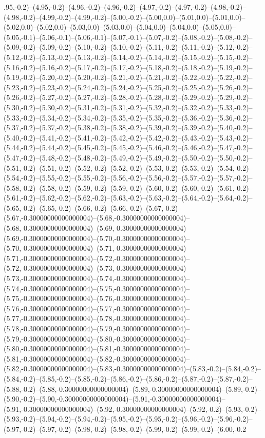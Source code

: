 .95,-0.2)--(4.95,-0.2)--(4.96,-0.2)--(4.96,-0.2)--(4.97,-0.2)--(4.97,-0.2)--(4.98,-0.2)--(4.98,-0.2)--(4.99,-0.2)--(4.99,-0.2)--(5.00,-0.2)--(5.00,0.0)--(5.01,0.0)--(5.01,0.0)--(5.02,0.0)--(5.02,0.0)--(5.03,0.0)--(5.03,0.0)--(5.04,0.0)--(5.04,0.0)--(5.05,0.0)--(5.05,-0.1)--(5.06,-0.1)--(5.06,-0.1)--(5.07,-0.1)--(5.07,-0.2)--(5.08,-0.2)--(5.08,-0.2)--(5.09,-0.2)--(5.09,-0.2)--(5.10,-0.2)--(5.10,-0.2)--(5.11,-0.2)--(5.11,-0.2)--(5.12,-0.2)--(5.12,-0.2)--(5.13,-0.2)--(5.13,-0.2)--(5.14,-0.2)--(5.14,-0.2)--(5.15,-0.2)--(5.15,-0.2)--(5.16,-0.2)--(5.16,-0.2)--(5.17,-0.2)--(5.17,-0.2)--(5.18,-0.2)--(5.18,-0.2)--(5.19,-0.2)--(5.19,-0.2)--(5.20,-0.2)--(5.20,-0.2)--(5.21,-0.2)--(5.21,-0.2)--(5.22,-0.2)--(5.22,-0.2)--(5.23,-0.2)--(5.23,-0.2)--(5.24,-0.2)--(5.24,-0.2)--(5.25,-0.2)--(5.25,-0.2)--(5.26,-0.2)--(5.26,-0.2)--(5.27,-0.2)--(5.27,-0.2)--(5.28,-0.2)--(5.28,-0.2)--(5.29,-0.2)--(5.29,-0.2)--(5.30,-0.2)--(5.30,-0.2)--(5.31,-0.2)--(5.31,-0.2)--(5.32,-0.2)--(5.32,-0.2)--(5.33,-0.2)--(5.33,-0.2)--(5.34,-0.2)--(5.34,-0.2)--(5.35,-0.2)--(5.35,-0.2)--(5.36,-0.2)--(5.36,-0.2)--(5.37,-0.2)--(5.37,-0.2)--(5.38,-0.2)--(5.38,-0.2)--(5.39,-0.2)--(5.39,-0.2)--(5.40,-0.2)--(5.40,-0.2)--(5.41,-0.2)--(5.41,-0.2)--(5.42,-0.2)--(5.42,-0.2)--(5.43,-0.2)--(5.43,-0.2)--(5.44,-0.2)--(5.44,-0.2)--(5.45,-0.2)--(5.45,-0.2)--(5.46,-0.2)--(5.46,-0.2)--(5.47,-0.2)--(5.47,-0.2)--(5.48,-0.2)--(5.48,-0.2)--(5.49,-0.2)--(5.49,-0.2)--(5.50,-0.2)--(5.50,-0.2)--(5.51,-0.2)--(5.51,-0.2)--(5.52,-0.2)--(5.52,-0.2)--(5.53,-0.2)--(5.53,-0.2)--(5.54,-0.2)--(5.54,-0.2)--(5.55,-0.2)--(5.55,-0.2)--(5.56,-0.2)--(5.56,-0.2)--(5.57,-0.2)--(5.57,-0.2)--(5.58,-0.2)--(5.58,-0.2)--(5.59,-0.2)--(5.59,-0.2)--(5.60,-0.2)--(5.60,-0.2)--(5.61,-0.2)--(5.61,-0.2)--(5.62,-0.2)--(5.62,-0.2)--(5.63,-0.2)--(5.63,-0.2)--(5.64,-0.2)--(5.64,-0.2)--(5.65,-0.2)--(5.65,-0.2)--(5.66,-0.2)--(5.66,-0.2)--(5.67,-0.2)--(5.67,-0.30000000000000004)--(5.68,-0.30000000000000004)--(5.68,-0.30000000000000004)--(5.69,-0.30000000000000004)--(5.69,-0.30000000000000004)--(5.70,-0.30000000000000004)--(5.70,-0.30000000000000004)--(5.71,-0.30000000000000004)--(5.71,-0.30000000000000004)--(5.72,-0.30000000000000004)--(5.72,-0.30000000000000004)--(5.73,-0.30000000000000004)--(5.73,-0.30000000000000004)--(5.74,-0.30000000000000004)--(5.74,-0.30000000000000004)--(5.75,-0.30000000000000004)--(5.75,-0.30000000000000004)--(5.76,-0.30000000000000004)--(5.76,-0.30000000000000004)--(5.77,-0.30000000000000004)--(5.77,-0.30000000000000004)--(5.78,-0.30000000000000004)--(5.78,-0.30000000000000004)--(5.79,-0.30000000000000004)--(5.79,-0.30000000000000004)--(5.80,-0.30000000000000004)--(5.80,-0.30000000000000004)--(5.81,-0.30000000000000004)--(5.81,-0.30000000000000004)--(5.82,-0.30000000000000004)--(5.82,-0.30000000000000004)--(5.83,-0.30000000000000004)--(5.83,-0.2)--(5.84,-0.2)--(5.84,-0.2)--(5.85,-0.2)--(5.85,-0.2)--(5.86,-0.2)--(5.86,-0.2)--(5.87,-0.2)--(5.87,-0.2)--(5.88,-0.2)--(5.88,-0.30000000000000004)--(5.89,-0.30000000000000004)--(5.89,-0.2)--(5.90,-0.2)--(5.90,-0.30000000000000004)--(5.91,-0.30000000000000004)--(5.91,-0.30000000000000004)--(5.92,-0.30000000000000004)--(5.92,-0.2)--(5.93,-0.2)--(5.93,-0.2)--(5.94,-0.2)--(5.94,-0.2)--(5.95,-0.2)--(5.95,-0.2)--(5.96,-0.2)--(5.96,-0.2)--(5.97,-0.2)--(5.97,-0.2)--(5.98,-0.2)--(5.98,-0.2)--(5.99,-0.2)--(5.99,-0.2)--(6.00,-0.2